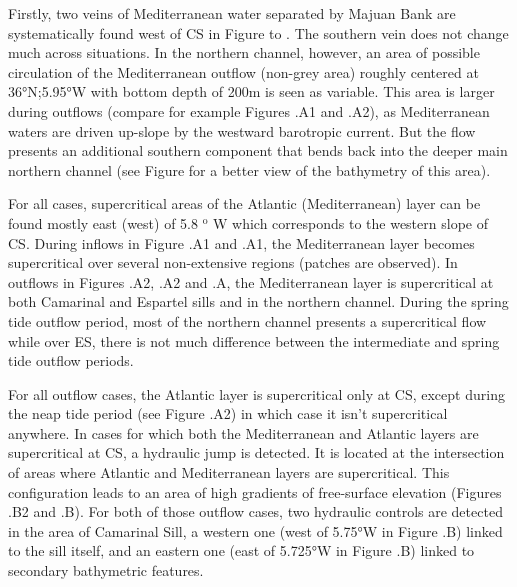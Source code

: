 Firstly, two veins of Mediterranean water separated by Majuan Bank are systematically found west of CS in Figure  to .
The southern vein does not change much across situations. In the northern channel, however, an area of possible circulation of the Mediterranean outflow (non-grey area) roughly centered at 36°N;5.95°W with bottom depth of 200m is seen as variable. This area is larger during outflows (compare for example Figures .A1 and .A2), as Mediterranean waters are driven up-slope by the westward barotropic current. But the flow presents an additional southern component that bends back into the deeper main northern channel (see Figure  for a better view of the bathymetry of this area).

For all cases, supercritical areas of the Atlantic (Mediterranean) layer can be found mostly east (west) of 5.8 $^\text{o}$ W which corresponds to the western slope of CS. During inflows in Figure .A1 and .A1, the Mediterranean layer becomes supercritical over several non-extensive regions (patches are observed). In outflows in Figures .A2, .A2 and .A, the Mediterranean layer is supercritical at both Camarinal and Espartel sills and in the northern channel.  During the spring tide outflow period, most of the northern channel presents a supercritical flow while over ES, there is not much difference between the intermediate and spring tide outflow periods.

For all outflow cases, the Atlantic layer is supercritical only at CS, except during the neap tide period (see Figure .A2) in which case it isn't supercritical anywhere. In cases for which both the Mediterranean and Atlantic layers are supercritical at CS, a hydraulic jump is detected. It is located at the intersection of areas where Atlantic and Mediterranean layers are supercritical. This configuration leads to an area of high gradients of free-surface elevation (Figures .B2 and .B). For both of those outflow cases, two hydraulic controls are detected in the area of Camarinal Sill, a western one (west of 5.75°W in Figure .B) linked to the sill itself, and an eastern one (east of 5.725°W in Figure .B) linked to secondary bathymetric features.


